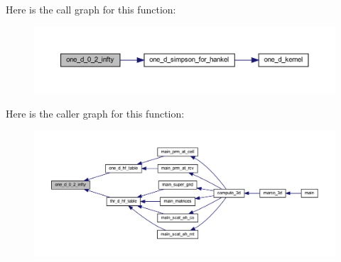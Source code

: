 Here is the call graph for this function\+:
\nopagebreak
\begin{figure}[H]
\begin{center}
\leavevmode
\includegraphics[width=350pt]{Marco_8f90_aec081d732a45837d045636e3ab309eb3_cgraph}
\end{center}
\end{figure}
Here is the caller graph for this function\+:
\nopagebreak
\begin{figure}[H]
\begin{center}
\leavevmode
\includegraphics[width=350pt]{Marco_8f90_aec081d732a45837d045636e3ab309eb3_icgraph}
\end{center}
\end{figure}
\mbox{\label{Marco_8f90_acfdc9c842d9566d75829e363d5bf3f41}} 
